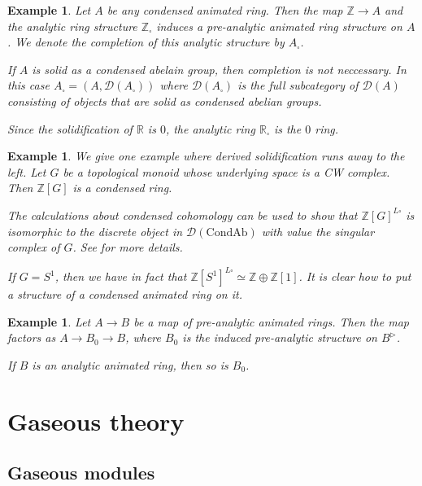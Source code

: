 \documentclass{article}
\theoremstyle{plain}
\newtheorem{exmp}[thm]{Example}
\theoremstyle{definition}
\theoremstyle{remark}
\newcommand{\huflag}{\triangleright}
\newcommand{\D}{\mathcal{D}}
\newcommand{\solid}{\square}
\begin{document}
\begin{exmp}
Let $ A $ be any condensed animated ring. Then the map $ \mathbb{Z}\to A $ and the analytic ring structure
$ \mathbb{Z}_{\solid} $ induces a pre-analytic animated ring structure on $ A $.
We denote the completion of this analytic structure by $ A _{\solid} $.

If $ A $ is solid as a condensed abelain group, then completion is not neccessary.
In this case $ A _{\solid} = (A, \D (A _{\solid})) $ where $ \D (A _{\solid}) $ is the full subcategory
of $ \D (A) $ consisting of objects that are solid as condensed abelian groups.

Since the solidification of $ \mathbb{R} $ is $ 0 $, the analytic ring $ \mathbb{R}_{\solid} $ is the $ 0 $ ring.
\end{exmp}

\begin{exmp}
We give one example where derived solidification runs away to the left.
Let $ G $ be a topological monoid whose underlying space is a CW complex.
Then $ \mathbb{Z}[G] $ is a condensed ring.

The calculations about condensed cohomology can be used to show that $ \mathbb{Z}[G]^{L\solid} $
is isomorphic to the discrete object in $ \D (\mathrm{CondAb}) $ with value the singular complex of $ G $.
See
\cite[\href{https://www.youtube.com/watch?v=KKzt6C9ggWA\&list=PLx5f8IelFRgGmu6gmL-Kf\_Rl\_6Mm7juZO\&index=6\&t=1090s}{Video 6, 18:10}]{ihesvid}
for more details.

If $ G = S ^{1} $, then we have in fact that $ \mathbb{Z}[S ^{1}]^{L\solid} \simeq \mathbb{Z} \oplus \mathbb{Z}[1] $.
It is clear how to put a structure of a condensed animated ring on it.
\end{exmp}

\begin{exmp}
Let $ A\to B $ be a map of pre-analytic animated rings.
Then the map factors as $ A \to B _{0}\to B $, where $ B _{0}$ is the induced pre-analytic
structure on $ B ^{\huflag} $.

If $ B $ is an analytic animated ring, then so is $ B _{0} $.
\end{exmp}

\section{Gaseous theory}

\subsection{Gaseous modules}
\end{document}
